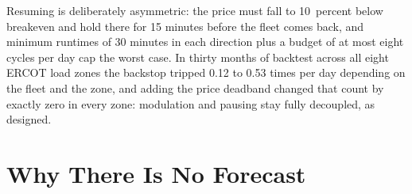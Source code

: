 Resuming is deliberately asymmetric: the price must fall to 10~percent below breakeven and hold there for 15 minutes before the fleet comes back, and minimum runtimes of 30 minutes in each direction plus a budget of at most eight cycles per day cap the worst case. %
In thirty months of backtest across all eight ERCOT load zones the backstop tripped 0.12 to 0.53 times per day depending on the fleet and the zone, and adding the price deadband changed that count by exactly zero in every zone: modulation and pausing stay fully decoupled, as designed. %

\section{Why There Is No Forecast}


